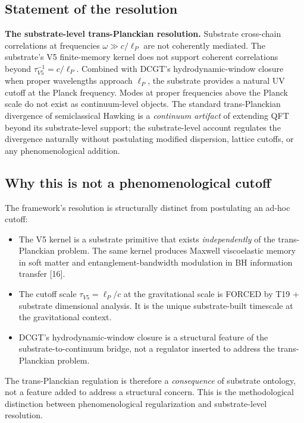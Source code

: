 \documentclass[11pt,a4paper]{article}
\begin{document}
\subsection{Statement of the resolution}

\textbf{The substrate-level trans-Planckian resolution.} Substrate cross-chain correlations at frequencies $\omega \gg c/\ell_P$ are not coherently mediated. The substrate's V5 finite-memory kernel does not support coherent correlations beyond $\tau_{V5}^{-1} = c/\ell_P$. Combined with DCGT's hydrodynamic-window closure when proper wavelengths approach $\ell_P$, the substrate provides a natural UV cutoff at the Planck frequency. Modes at proper frequencies above the Planck scale do not exist as continuum-level objects. The standard trans-Planckian divergence of semiclassical Hawking is a \emph{continuum artifact} of extending QFT beyond its substrate-level support; the substrate-level account regulates the divergence naturally without postulating modified dispersion, lattice cutoffs, or any phenomenological addition.

\subsection{Why this is not a phenomenological cutoff}

The framework's resolution is structurally distinct from postulating an ad-hoc cutoff:

\begin{itemize}[noitemsep]
\item The V5 kernel is a substrate primitive that exists \emph{independently} of the trans-Planckian problem. The same kernel produces Maxwell viscoelastic memory in soft matter and entanglement-bandwidth modulation in BH information transfer [16].
\item The cutoff scale $\tau_{V5} = \ell_P/c$ at the gravitational scale is FORCED by T19 + substrate dimensional analysis. It is the unique substrate-built timescale at the gravitational context.
\item DCGT's hydrodynamic-window closure is a structural feature of the substrate-to-continuum bridge, not a regulator inserted to address the trans-Planckian problem.
\end{itemize}

The trans-Planckian regulation is therefore a \emph{consequence} of substrate ontology, not a feature added to address a structural concern. This is the methodological distinction between phenomenological regularization and substrate-level resolution.
\end{document}
